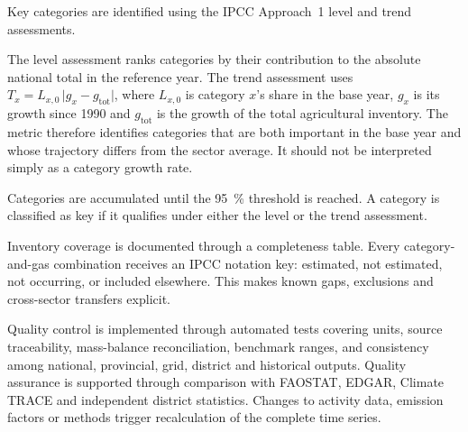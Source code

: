 Key categories are identified using the IPCC Approach~1 level and trend assessments.

The level assessment ranks categories by their contribution to the absolute national total
in the reference year. The trend assessment uses
$T_x = L_{x,0}\,\lvert g_x - g_{\mathrm{tot}}\rvert$, where $L_{x,0}$ is category $x$'s
share in the base year, $g_x$ is its growth since 1990 and $g_{\mathrm{tot}}$ is the growth
of the total agricultural inventory. The metric therefore identifies categories that are
both important in the base year and whose trajectory differs from the sector average. It
should not be interpreted simply as a category growth rate.

Categories are accumulated until the \SI{95}{\percent} threshold is reached. A category is
classified as key if it qualifies under either the level or the trend assessment.

Inventory coverage is documented through a completeness table. Every \AFOLU{}
category-and-gas combination receives an IPCC notation key: estimated, not estimated, not
occurring, or included elsewhere. This makes known gaps, exclusions and cross-sector
transfers explicit.

Quality control is implemented through automated tests covering units, source traceability,
mass-balance reconciliation, benchmark ranges, and consistency among national, provincial,
grid, district and historical outputs. Quality assurance is supported through comparison
with FAOSTAT, EDGAR, Climate TRACE and independent district statistics. Changes to activity
data, emission factors or methods trigger recalculation of the complete time series.
